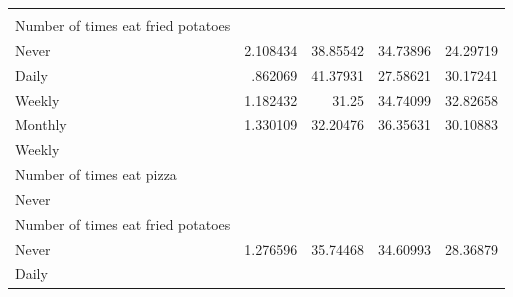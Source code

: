 \documentclass{article}
\begin{document}
\begin{table}[!h]
{\begin{tabular}{lllll}
			\multicolumn{1}{r}{} \\
			\multicolumn{1}{l}{\hspace{4em}Number of times eat fried potatoes} &
			\multicolumn{1}{|r}{} &
			\multicolumn{1}{r}{} &
			\multicolumn{1}{r}{} &
			\multicolumn{1}{r}{} \\
			\multicolumn{1}{l}{\hspace{5em}Never} &
			\multicolumn{1}{|r}{2.108434} &
			\multicolumn{1}{r}{38.85542} &
			\multicolumn{1}{r}{34.73896} &
			\multicolumn{1}{r}{24.29719} \\
			\multicolumn{1}{l}{\hspace{5em}Daily} &
			\multicolumn{1}{|r}{.862069} &
			\multicolumn{1}{r}{41.37931} &
			\multicolumn{1}{r}{27.58621} &
			\multicolumn{1}{r}{30.17241} \\
			\multicolumn{1}{l}{\hspace{5em}Weekly} &
			\multicolumn{1}{|r}{1.182432} &
			\multicolumn{1}{r}{31.25} &
			\multicolumn{1}{r}{34.74099} &
			\multicolumn{1}{r}{32.82658} \\
			\multicolumn{1}{l}{\hspace{5em}Monthly} &
			\multicolumn{1}{|r}{1.330109} &
			\multicolumn{1}{r}{32.20476} &
			\multicolumn{1}{r}{36.35631} &
			\multicolumn{1}{r}{30.10883} \\
			\multicolumn{1}{l}{\hspace{1em}Weekly} &
			\multicolumn{1}{|r}{} &
			\multicolumn{1}{r}{} &
			\multicolumn{1}{r}{} &
			\multicolumn{1}{r}{} \\
			\multicolumn{1}{l}{\hspace{2em}Number of times eat pizza} &
			\multicolumn{1}{|r}{} &
			\multicolumn{1}{r}{} &
			\multicolumn{1}{r}{} &
			\multicolumn{1}{r}{} \\
			\multicolumn{1}{l}{\hspace{3em}Never} &
			\multicolumn{1}{|r}{} &
			\multicolumn{1}{r}{} &
			\multicolumn{1}{r}{} &
			\multicolumn{1}{r}{} \\
			\multicolumn{1}{l}{\hspace{4em}Number of times eat fried potatoes} &
			\multicolumn{1}{|r}{} &
			\multicolumn{1}{r}{} &
			\multicolumn{1}{r}{} &
			\multicolumn{1}{r}{} \\
			\multicolumn{1}{l}{\hspace{5em}Never} &
			\multicolumn{1}{|r}{1.276596} &
			\multicolumn{1}{r}{35.74468} &
			\multicolumn{1}{r}{34.60993} &
			\multicolumn{1}{r}{28.36879} \\
			\multicolumn{1}{l}{\hspace{5em}Daily} &

\end{tabular}}
\end{table}
\end{document}
